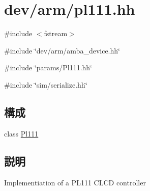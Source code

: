\hypertarget{pl111_8hh}{
\section{dev/arm/pl111.hh}
\label{pl111_8hh}
}
{\ttfamily \#include $<$fstream$>$}\par
{\ttfamily \#include \char`\"{}dev/arm/amba\_\-device.hh\char`\"{}}\par
{\ttfamily \#include \char`\"{}params/Pl111.hh\char`\"{}}\par
{\ttfamily \#include \char`\"{}sim/serialize.hh\char`\"{}}\par
\subsection*{構成}
\begin{DoxyCompactItemize}
\item 
class \hyperlink{classPl111}{Pl111}
\end{DoxyCompactItemize}


\subsection{説明}
Implementiation of a PL111 CLCD controller 